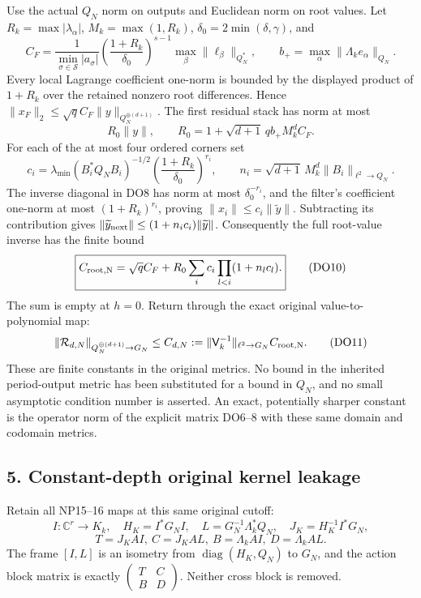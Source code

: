 \documentclass[11pt]{article}
\begin{document}
Use the actual \(Q_N\) norm on outputs and Euclidean norm on root values. Let \(R_k=\max|\lambda_\alpha|\), \(M_k=\max(1,R_k)\), \(\delta_0=2\min(\delta,\gamma)\), and \[
C_F=\frac1{\min_{\sigma\in\mathcal S}|a_\sigma|}
\left(\frac{1+R_k}{\delta_0}\right)^{s-1}
\max_\beta\|\ell_\beta\|_{Q_N^*},\qquad
b_+=\max_\alpha\|\Lambda_k e_\alpha\|_{Q_N}.
\] Every local Lagrange coefficient one-norm is bounded by the displayed product of \(1+R_k\) over the retained nonzero root differences. Hence \(\|x_F\|_2\le\sqrt q C_F\|y\|_{Q_N^{\oplus(d+1)}}\). The first residual stack has norm at most \[
R_0\|y\|,\qquad
R_0=1+\sqrt{d+1}\,q b_+M_k^d C_F.
\] For each of the at most four ordered corners set \[
c_i=\lambda_{\min}(B_i^*Q_NB_i)^{-1/2}
\left(\frac{1+R_k}{\delta_0}\right)^{r_i},\qquad
n_i=\sqrt{d+1}\,M_k^d\|B_i\|_{\ell^2\to Q_N}.
\] The inverse diagonal in DO8 has norm at most \(\delta_0^{-r_i}\), and the filter's coefficient one-norm at most \((1+R_k)^{r_i}\), proving \(\|x_i\|\le c_i\|\widetilde y\|\). Subtracting its contribution gives \(\|\widetilde y_{\rm next}\|\le(1+n_ic_i)\|\widetilde y\|\). Consequently the full root-value inverse has the finite bound \[
\boxed{\displaystyle
C_{\rm root,N}=\sqrt q C_F+
R_0\sum_i c_i\prod_{l<i}(1+n_lc_l).}
\tag{DO10}
\] The sum is empty at \(h=0\). Return through the exact original value-to-polynomial map: \[
\|\mathcal R_{d,N}\|_{Q_N^{\oplus(d+1)}\to G_N}
\le C_{d,N}:=\|\mathsf V_k^{-1}\|_{\ell^2\to G_N}C_{\rm root,N}.
\tag{DO11}
\] These are finite constants in the original metrics. No bound in the inherited period-output metric has been substituted for a bound in \(Q_N\), and no small asymptotic condition number is asserted. An exact, potentially sharper constant is the operator norm of the explicit matrix DO6--8 with these same domain and codomain metrics.

\subsection{5. Constant-depth original kernel leakage}\label{pdepth:constant-depth-original-kernel-leakage}

Retain all NP15--16 maps at this same original cutoff: \[
I:\mathbb C^r\to K_k,\quad H_K=I^*G_NI,\quad
L=G_N^{-1}\Lambda_k^*Q_N,\quad J_K=H_K^{-1}I^*G_N,
\] \[
T=J_KAI,\ C=J_KAL,\ B=\Lambda_k AI,\ D=\Lambda_k AL.
\tag{DO12}
\] The frame \([I,L]\) is an isometry from \(\operatorname{diag}(H_K,Q_N)\) to \(G_N\), and the action block matrix is exactly \(\left(\begin{smallmatrix}T&C\\B&D\end{smallmatrix}\right)\). Neither cross block is removed.
\end{document}
